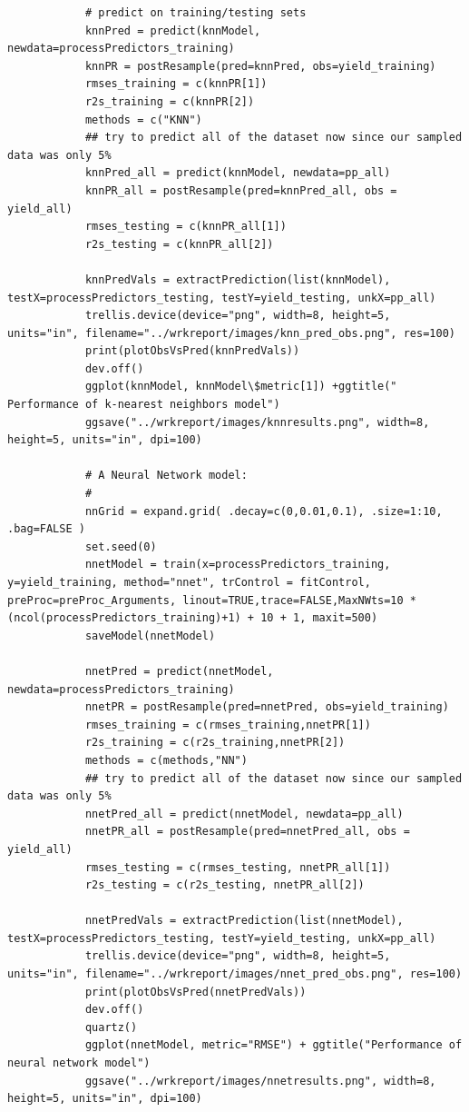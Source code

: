 \documentclass[letterpaper,12pt,titlepage,oneside,final]{report}
\begin{document}
\begin{multicols}{2}
\begin{verbatim}
            # predict on training/testing sets
            knnPred = predict(knnModel, newdata=processPredictors_training)
            knnPR = postResample(pred=knnPred, obs=yield_training)
            rmses_training = c(knnPR[1])
            r2s_training = c(knnPR[2])
            methods = c("KNN")
            ## try to predict all of the dataset now since our sampled data was only 5%
            knnPred_all = predict(knnModel, newdata=pp_all)
            knnPR_all = postResample(pred=knnPred_all, obs = yield_all)
            rmses_testing = c(knnPR_all[1])
            r2s_testing = c(knnPR_all[2])

            knnPredVals = extractPrediction(list(knnModel), testX=processPredictors_testing, testY=yield_testing, unkX=pp_all)
            trellis.device(device="png", width=8, height=5, units="in", filename="../wrkreport/images/knn_pred_obs.png", res=100)
            print(plotObsVsPred(knnPredVals))
            dev.off() 
            ggplot(knnModel, knnModel\$metric[1]) +ggtitle(" Performance of k-nearest neighbors model")
            ggsave("../wrkreport/images/knnresults.png", width=8, height=5, units="in", dpi=100)

            # A Neural Network model:
            #
            nnGrid = expand.grid( .decay=c(0,0.01,0.1), .size=1:10, .bag=FALSE )
            set.seed(0)
            nnetModel = train(x=processPredictors_training, y=yield_training, method="nnet", trControl = fitControl, preProc=preProc_Arguments, linout=TRUE,trace=FALSE,MaxNWts=10 * (ncol(processPredictors_training)+1) + 10 + 1, maxit=500)
            saveModel(nnetModel)

            nnetPred = predict(nnetModel, newdata=processPredictors_training)
            nnetPR = postResample(pred=nnetPred, obs=yield_training)
            rmses_training = c(rmses_training,nnetPR[1])
            r2s_training = c(r2s_training,nnetPR[2])
            methods = c(methods,"NN")
            ## try to predict all of the dataset now since our sampled data was only 5%
            nnetPred_all = predict(nnetModel, newdata=pp_all)
            nnetPR_all = postResample(pred=nnetPred_all, obs = yield_all)
            rmses_testing = c(rmses_testing, nnetPR_all[1])
            r2s_testing = c(r2s_testing, nnetPR_all[2])

            nnetPredVals = extractPrediction(list(nnetModel), testX=processPredictors_testing, testY=yield_testing, unkX=pp_all)
            trellis.device(device="png", width=8, height=5, units="in", filename="../wrkreport/images/nnet_pred_obs.png", res=100)
            print(plotObsVsPred(nnetPredVals))
            dev.off()
            quartz()
            ggplot(nnetModel, metric="RMSE") + ggtitle("Performance of neural network model")
            ggsave("../wrkreport/images/nnetresults.png", width=8, height=5, units="in", dpi=100)


\end{verbatim}
\end{multicols}
\end{document}
